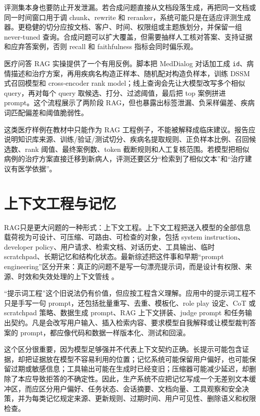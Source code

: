 \documentclass[UTF8,zihao=-4,openany]{ctexbook}
\newcommand{\rag}{RAG}
\begin{document}
评测集本身也要防止开发泄漏。若合成问题直接从文档段落生成，再把同一文档或同一时间窗口用于调 chunk、rewrite 和 reranker，系统可能只是在适应评测生成器。更稳健的切分应按文档、客户、时间、权限组或主题族划分，并保留一组 never-tuned 查询。合成问题可以扩大覆盖，但需要抽样人工核对答案、支持证据和应弃答案例，否则 recall 和 faithfulness 指标会同时偏乐观。

医疗问答 RAG 实操提供了一个有用反例。脚本把 MedDialog 对话加工成 \texttt{id}、病情描述和治疗方案，再用疾病名构造正样本、随机配对构造负样本，训练 DSSM 式召回模型和 cross-encoder rank model；线上查询会先让大模型改写多个相似 query，再对每个 query 取候选、打分、过滤阈值，最后把 top 案例拼进 prompt。这个流程展示了两阶段 RAG，但也暴露出标签泄漏、负采样偏差、疾病词匹配偏差和阈值脆弱性。

这类医疗样例在教材中只能作为 RAG 工程例子，不能被解释成临床建议。报告应说明知识库来源、训练/验证/测试切分、疾病名提取规则、正负样本比例、召回候选数、rank 阈值、最终案例数、token 截断规则和人工复核范围。若模型把相似病例的治疗方案直接迁移到新病人，评测还要区分“检索到了相似文本”和“治疗建议有医学依据”。

\section{上下文工程与记忆}
\rag 只是更大问题的一种形式：上下文工程。上下文工程把送入模型的全部信息载荷视为可设计、可压缩、可路由、可检查的对象，包括 system instruction、developer policy、用户请求、检索文档、对话历史、工具输出、临时 scratchpad、长期记忆和结构化状态。最新综述把这件事和早期“prompt engineering”区分开来：真正的问题不是写一句漂亮提示词，而是设计有权限、来源、时效和失效处理的上下文管线 \cite{mei2025context}。

“提示词工程”这个旧说法仍有价值，但应按工程含义理解。应用中的提示词工程不只是手写一句 prompt，还包括批量重写、去重、模板化、role play 设定、CoT 或 scratchpad 策略、数据生成 prompt、RAG 上下文拼装、judge prompt 和任务输出契约。凡是会改写用户输入、插入检索内容、要求模型自我解释或让模型裁判答案的 prompt，都应像代码和数据一样版本化、测试和回滚。

这个区分很重要，因为模型足够强并不代表上下文契约正确。长提示可能包含证据，却把证据放在模型不容易利用的位置；记忆系统可能保留用户偏好，也可能保留过期或敏感信息；工具输出可能在生成时已经变旧；压缩器可能减少延迟，却删除了本应导致拒答的不确定性。因此，生产系统不应把记忆写成一个无差别文本缓冲区，而应区分用户偏好、任务状态、会话摘要、文档向量、工具观察和安全决策，并为每类记忆规定来源、更新规则、过期时间、用户可见性、删除语义和权限检查。
\end{document}
